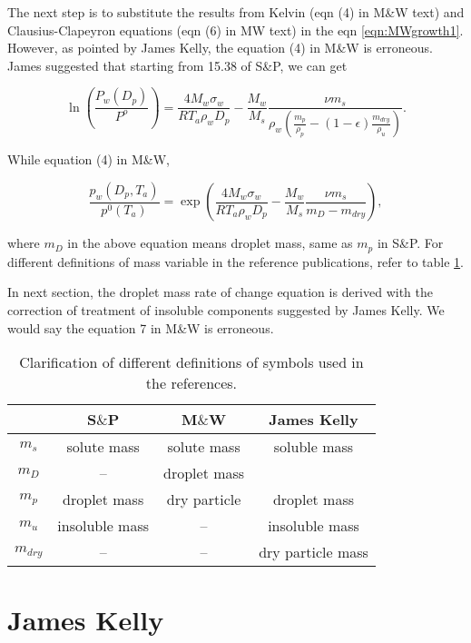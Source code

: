 \documentclass[12pt]{amsart}
\begin{document}
The next step is to substitute the results from Kelvin (eqn (4) in M\&W text) and Clausius-Clapeyron equations (eqn (6) in MW text) in the eqn \ref{eqn:MWgrowth1}. However, as pointed by James Kelly, the equation (4) in M\&W is erroneous. James suggested that starting from 15.38 of S\&P, we can get 

\begin{equation} 
\ln(\frac{P_{w}(D_{p})}{P^{o}})=\frac{4 M_{w} \sigma_{w}}{R T_{a} \rho_{w}D_{p}}-\frac{M_{w}}{M_{s}}\frac{\nu m_{s}}{\rho_w(\frac{m_p}{\rho_p}-(1-\epsilon)\frac{m_{dry}}{\rho_u})}.
\end{equation}

While equation (4) in M\&W, 

\begin{equation}
\frac{p_{w}(D_{p}, T_{a})}{p^{0}(T_{a})}=\exp(\frac{4 M_{w} \sigma_{w}}{R T_{a} \rho_{w} D_{p}}-\frac{M_{w}}{M_{s}}\frac{\nu m_{s}}{m_{D}-m_{dry}}),
\end{equation}

where $m_{D}$ in the above equation means droplet mass, same as $m_{p}$ in S\&P. For different definitions of mass variable in the reference publications, refer to table \ref{table:1}. 

In next section, the droplet mass rate of change equation is derived with the correction of treatment of insoluble components suggested by James Kelly. We would say the equation 7 in M\&W is erroneous.



\begin{table}\label{table:1}
\caption{Clarification of different definitions of symbols used in the references.}
\begin{center}
\begin{tabular}{cccc} \hline
   & S$\&$P  &  M$\&$W   & James Kelly \\ \hline
$m_{s}$  &   solute mass  & solute mass  &   soluble mass \\ 
$m_{D}$  & --  &  droplet mass  &   \\ 
$m_{p}$  & droplet mass  &  dry particle &  droplet mass \\ 
$m_{u}$  & insoluble mass  & -- & insoluble mass \\ 
$m_{dry}$ &  -- & -- & dry particle mass \\ \hline
\end{tabular}
\end{center}
\end{table}


\section{James Kelly}
\end{document}
